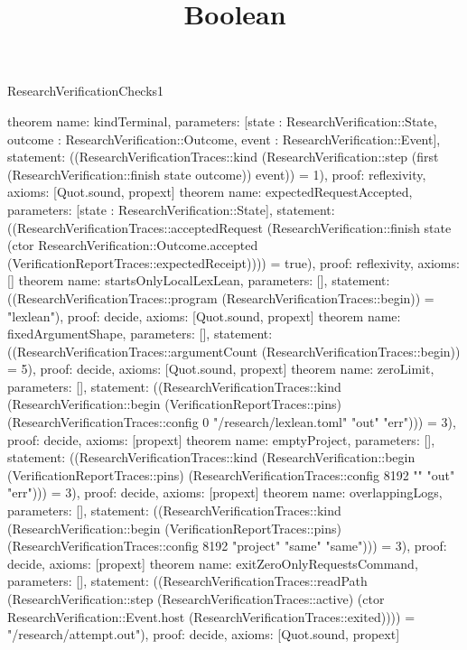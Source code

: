 \begin{lexlean}{ResearchVerificationChecks1}
\title{Boolean}
\begin{semanticmodule}
theorem{
  name: kindTerminal,
  parameters: [state : ResearchVerification::State, outcome : ResearchVerification::Outcome, event : ResearchVerification::Event],
  statement: ((ResearchVerificationTraces::kind (ResearchVerification::step (first (ResearchVerification::finish state outcome)) event)) = 1),
  proof: reflexivity{},
  axioms: [Quot.sound, propext]
}
theorem{
  name: expectedRequestAccepted,
  parameters: [state : ResearchVerification::State],
  statement: ((ResearchVerificationTraces::acceptedRequest (ResearchVerification::finish state (ctor ResearchVerification::Outcome.accepted (VerificationReportTraces::expectedReceipt)))) = true),
  proof: reflexivity{},
  axioms: []
}
theorem{
  name: startsOnlyLocalLexLean,
  parameters: [],
  statement: ((ResearchVerificationTraces::program (ResearchVerificationTraces::begin)) = "lexlean"),
  proof: decide{},
  axioms: [Quot.sound, propext]
}
theorem{
  name: fixedArgumentShape,
  parameters: [],
  statement: ((ResearchVerificationTraces::argumentCount (ResearchVerificationTraces::begin)) = 5),
  proof: decide{},
  axioms: [Quot.sound, propext]
}
theorem{
  name: zeroLimit,
  parameters: [],
  statement: ((ResearchVerificationTraces::kind (ResearchVerification::begin (VerificationReportTraces::pins) (ResearchVerificationTraces::config 0 "/research/lexlean.toml" "out" "err"))) = 3),
  proof: decide{},
  axioms: [propext]
}
theorem{
  name: emptyProject,
  parameters: [],
  statement: ((ResearchVerificationTraces::kind (ResearchVerification::begin (VerificationReportTraces::pins) (ResearchVerificationTraces::config 8192 "" "out" "err"))) = 3),
  proof: decide{},
  axioms: [propext]
}
theorem{
  name: overlappingLogs,
  parameters: [],
  statement: ((ResearchVerificationTraces::kind (ResearchVerification::begin (VerificationReportTraces::pins) (ResearchVerificationTraces::config 8192 "project" "same" "same"))) = 3),
  proof: decide{},
  axioms: [propext]
}
theorem{
  name: exitZeroOnlyRequestsCommand,
  parameters: [],
  statement: ((ResearchVerificationTraces::readPath (ResearchVerification::step (ResearchVerificationTraces::active) (ctor ResearchVerification::Event.host (ResearchVerificationTraces::exited)))) = "/research/attempt.out"),
  proof: decide{},
  axioms: [Quot.sound, propext]
}
\end{semanticmodule}
\end{lexlean}
